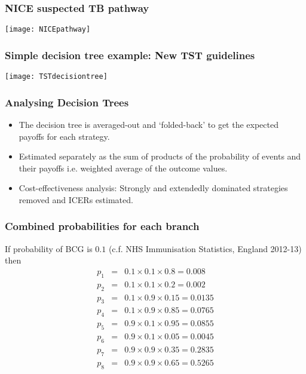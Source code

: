 \begin{frame}
\frametitle{NICE suspected TB pathway}
 \texttt{[image: NICEpathway]}
\end{frame} 

\begin{frame}
\frametitle{Simple decision tree example: New TST guidelines}
 \texttt{[image: TSTdecisiontree]}
\end{frame}

\begin{frame}
\frametitle{Analysing Decision Trees}
	\begin{itemize}
		\item The decision tree is averaged-out and `folded-back' to get the expected payoffs for each strategy.
		\item Estimated separately as the sum of products of the probability of events and their payoffs i.e.
\alert{weighted average} of the outcome values.
		\item Cost-effectiveness analysis: Strongly and extendedly dominated strategies removed and ICERs estimated.
	\end{itemize}
\end{frame}

\begin{frame}
\frametitle{Combined probabilities for each branch}
 If probability of BCG is $0.1$ (c.f. NHS Immunisation Statistics, England 2012-13) then
\begin{eqnarray*}
p_1 &=& 0.1 \times 0.1 \times 0.8 = 0.008\\
p_2 &=& 0.1 \times 0.1 \times 0.2 = 0.002\\
p_3 &=& 0.1 \times 0.9 \times 0.15 = 0.0135\\
p_4 &=& 0.1 \times 0.9 \times 0.85 = 0.0765\\
p_5 &=& 0.9 \times 0.1 \times 0.95 = 0.0855\\
p_6 &=& 0.9 \times 0.1 \times 0.05 = 0.0045\\
p_7 &=& 0.9 \times 0.9 \times 0.35 = 0.2835\\
p_8 &=& 0.9 \times 0.9 \times 0.65 = 0.5265
\end{eqnarray*}
\end{frame}

